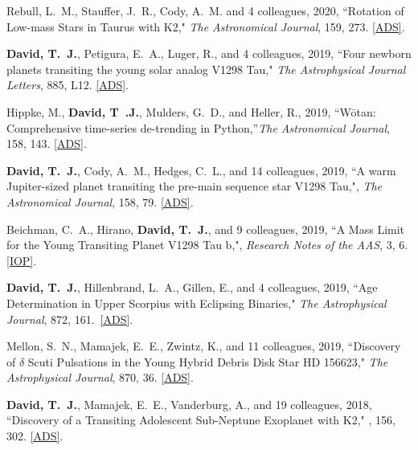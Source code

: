 \item {Rebull}, L.~M., {Stauffer}, J.~R., {Cody}, A.~M. and 4 colleagues, 2020, ``{Rotation of Low-mass Stars in Taurus with K2}," \textit{The Astronomical Journal}, 159, 273. \href{https://ui.adsabs.harvard.edu/abs/2020AJ....159..273R/abstract}{[ADS]}.

\item {\bf {David}, T.~J.}, {Petigura}, E.~A., {Luger}, R., and 4 colleagues, 2019, ``{Four newborn planets transiting the young solar analog V1298 Tau}," \textit{The Astrophysical Journal Letters}, 885, L12. \href{https://ui.adsabs.harvard.edu/abs/2019arXiv191004563D/abstract}{[ADS]}.

\item {Hippke}, M., \textbf{{David}, T~.J.}, {Mulders}, G.~D., and {Heller}, R., 2019, ``{W\={o}tan: Comprehensive time-series de-trending in Python},''\textit{The Astronomical Journal}, 158, 143. \href{https://ui.adsabs.harvard.edu/abs/2019AJ....158..143H/abstract}{[ADS]}.

\item {\bf {David}, T.~J.}, {Cody}, A.~M., {Hedges}, C.~L., and 14 colleagues, 2019, ``{A warm Jupiter-sized planet transiting the pre-main sequence star V1298 Tau},", \textit{The Astronomical Journal}, 158, 79. \href{https://ui.adsabs.harvard.edu/abs/2019AJ....158...79D/abstract}{[ADS]}.

\item {Beichman}, C.~A., {Hirano}, {\bf {David}, T.~J.}, and 9 colleagues, 2019, ``{A Mass Limit for the Young Transiting Planet V1298 Tau b},", \textit{Research Notes of the AAS}, 3, 6. \href{https://iopscience.iop.org/article/10.3847/2515-5172/ab2c9d}{[IOP]}.

\item {\bf {David}, T.~J.}, {Hillenbrand}, L.~A., {Gillen}, E., and 4 colleagues, 2019, ``{Age Determination in Upper Scorpius with Eclipsing Binaries}," \textit{The Astrophysical Journal}, 872, 161.\ \href{https://ui.adsabs.harvard.edu/abs/2019ApJ...872..161D/abstract}{[ADS]}.

\item {Mellon}, S.~N., {Mamajek}, E.~E., Zwintz, K., and 11 colleagues, 2019, ``{Discovery of $\delta$ Scuti Pulsations in the Young Hybrid Debris Disk Star HD 156623}," \textit{The Astrophysical Journal}, 870, 36. \href{https://ui.adsabs.harvard.edu/#abs/2019ApJ...870...36M/}{[ADS]}.

\item {\bf {David}, T.~J.}, {Mamajek}, E.~E., {Vanderburg}, A., and 19 colleagues, 2018, ``{Discovery of a Transiting Adolescent Sub-Neptune Exoplanet with K2}," \aj, 156, 302.  \href{https://ui.adsabs.harvard.edu/#abs/2018AJ....156..302D/}{[ADS]}. 

